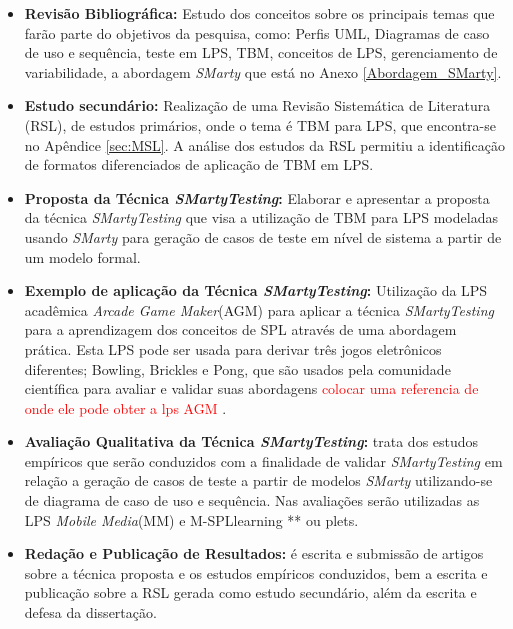 \begin{itemize}
	\item \textbf{Revisão Bibliográfica:} Estudo dos conceitos sobre os principais temas que farão parte do objetivos da pesquisa, como: Perfis UML, Diagramas de caso de uso e sequência, teste em LPS, TBM, conceitos de LPS, gerenciamento de variabilidade, a abordagem \textit{SMarty} que está no Anexo \ref{Abordagem_SMarty}. 
	
	\item \textbf{Estudo secundário:} Realização de uma Revisão Sistemática de Literatura (RSL), de estudos primários, onde o tema é TBM para LPS, que encontra-se no Apêndice \ref{sec:MSL}. A análise dos estudos da RSL permitiu a identificação de formatos diferenciados de aplicação de TBM em LPS.
	
	\item \textbf{Proposta da Técnica \textit{SMartyTesting}:} Elaborar e apresentar a proposta da técnica \textit{SMartyTesting} que visa a utilização de TBM para LPS modeladas usando \textit{SMarty} para geração de casos de teste em nível de sistema a partir de um modelo formal.
	
	\item \textbf{Exemplo de aplicação da Técnica \textit{SMartyTesting}:} Utilização da LPS acadêmica \textit{Arcade Game Maker}(AGM) para aplicar a técnica \textit{SMartyTesting} para a aprendizagem dos conceitos de SPL através de uma abordagem prática. Esta LPS pode ser usada para derivar três jogos eletrônicos diferentes; Bowling, Brickles e Pong, que são usados pela comunidade científica para avaliar e validar suas abordagens \textcolor{red}{colocar uma referencia de onde ele pode obter a lps AGM} \cite{costa2016split}.
	
	\item \textbf{Avaliação Qualitativa da Técnica \textit{SMartyTesting}:} trata dos estudos empíricos que serão conduzidos com a finalidade de validar \textit{SMartyTesting} em relação a geração de casos de teste a partir de modelos \textit{SMarty} utilizando-se de diagrama de caso de uso e sequência. Nas avaliações serão utilizadas as LPS \textit{Mobile Media}(MM) e M-SPLlearning ** ou plets.
	
	\item \textbf{Redação e Publicação de Resultados:} é escrita e submissão de artigos sobre a técnica proposta e os estudos empíricos conduzidos, bem a escrita e publicação sobre a RSL gerada como estudo secundário, além da escrita e defesa da dissertação.
	
	
\end{itemize}

